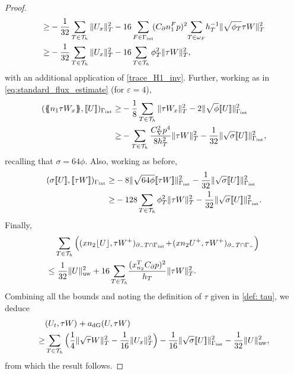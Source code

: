 \documentclass{amsart}
\newcommand{\norm}[2]{\|{#1}\|_{{#2}}}
\newcommand{\jump}[1]{[\kern-0.6mm [{#1}]\kern-0.6mm]}
\newcommand{\av}[1]{\{\kern-1.2mm \{{#1}\}\kern-1.2mm\}}
\newcommand{\su}{\sum_{T \in \Th}}
\newcommand{\inner}[3]{({#1},{#2})_{{#3}}}
\newcommand{\Th}{\mathcal{T}_h}
\newcommand{\gint}{\Gamma_{\rm int}}
\newcommand{\gif}{\Gamma_-}
\newcommand{\cinvT}{C_{\partial}}
\newcommand{\cinv}{C_{\nabla}}
\newcommand{\normal}{{n}}
\newcommand{\jumpu}[1]{ \lfloor #1 \rfloor }
\newcommand{\avg }[1]{ \av{ #1}}
\newcommand{\xn}{x_{n_2}^{T}}
\newcommand{\utr}{W}
\theoremstyle{definition}
\theoremstyle{remark}
\numberwithin{equation}{section}
\begin{document}
\begin{proof}
\begin{equation}
\begin{split}
		\ge &	-
		\frac{1}{32}\su \norm{U_x}{T}^2-16\sum_{F\in \gint }\! (\cinvT n_1^Fp)^2 \!\sum_{T\in\omega_F}  \! h_T^{-1} \norm{ \sqrt{\phi_T} \tau \utr}{ T}^2\\
			\ge &	-
		\frac{1}{32}\su \norm{U_x}{T}^2-16\su \phi_T^2\norm{  \tau \utr}{ T}^2,
\end{split}\end{equation}
 with an additional application of \eqref{trace_H1_inv}. Further, working as in \eqref{eq:standard_flux_estimate} (for $\varepsilon=4$),
 \[
 \begin{split}
 	\inner{\avg{\normal_1 \tau\utr_x}}{\jump{U}}{\gint }
 	\ge &
 		-
 	\frac{1}{8}\su \norm{ \tau\utr_x}{T}^2
 	-2 \norm{\sqrt{\phi}\jump{U}}{\gint}^2\\
 	\ge &
 	-
 	\su \frac{\cinv^2 p^4}{8h_T^2}\norm{ \tau\utr}{T}^2
 	-\frac{1}{32} \norm{\sqrt{\sigma}\jump{U}}{\gint}^2,
 \end{split}
 \]
 recalling that $\sigma=64\phi$. Also, working as before,
  \[
 \begin{split}
 	\inner{\sigma \jump{U}}{\jump{\tau\utr}}{\gint }
 		\ge &
 	-
 	8\norm{\sqrt{64\phi}\jump{\tau\utr}}{\gint}^2
 	-\frac{1}{32} \norm{\sqrt{\sigma}\jump{U}}{\gint}^2\\
 	\ge &
 	-
 	128\su \phi_T^2\norm{ \tau\utr}{T}^2
 	-\frac{1}{32} \norm{\sqrt{\sigma}\jump{U}}{\gint}^2.
 \end{split}
 \]
 Finally,
 \[
  \begin{aligned}
 &\su\Big(  \inner{x\normal_2 \jumpu{U}}{\tau W^+}{\partial_- T \cap \gint}
 \!+\!
 \inner{x\normal_2 U^+}{\tau W^+}{\partial_- T \cap \gif}\Big)
\\
\le&\ \frac{1}{32}\norm{U}{\rm uw}^2
 +16\su \!\frac{(\xn\cinvT  p)^2}{h_T} \norm{\tau\utr}{T}^2.
 \end{aligned}
 \]
Combining all the bounds and noting the definition of $\tau$ given in \eqref{def: tau}, we deduce
\begin{equation*}
\begin{split}
 &  \inner{U_t}{\tau\utr}{} + a_{\rm dG}(U,\tau\utr) \\
    \geq&
    \su\Big(
   \frac{1}{4} \norm{\sqrt{\tau} \utr }{T}^2
    -
     \frac{1}{16} \norm{U_x}{T}^2\Big)
 -
     \frac{1}{16} \norm{\sqrt{\sigma}\jump{U}}{\gint }^2
    -\frac{1}{32}\norm{U}{\rm uw}^2,
\end{split}\end{equation*}
from which the result follows.
\end{proof}
\end{document}
